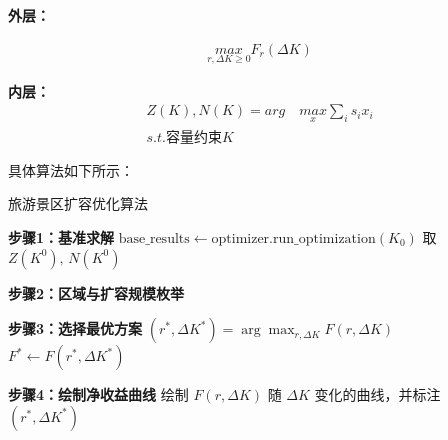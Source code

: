 \noindent\textbf{外层：}

\begin{equation}
  \begin{aligned}
    \underset{r,\Delta K \geq 0}{max} F_{r}(\Delta K)
  \end{aligned}
\end{equation}

\noindent\textbf{内层：}
\begin{equation}
  \begin{aligned}
    Z(K),N(K)=arg\quad \underset{x}{max} \sum_{i}s_{i}x_{i}\\
    s.t. \text{容量约束}K
  \end{aligned}
\end{equation}

具体算法如下所示：

\begin{algorithm}[H]\small
  \renewcommand{\algorithmcfname}{算法}
  \caption{旅游景区扩容优化算法}


  \textbf{步骤1：基准求解}\;
  $\text{base\_results}\leftarrow\text{optimizer.run\_optimization}(K_0)$\;
  取 $Z(K^0),\,N(K^0)$\;

  \textbf{步骤2：区域与扩容规模枚举}\;

  \textbf{步骤3：选择最优方案}\;
  $(r^*,\Delta K^*) = \arg\max_{r,\Delta K} F(r,\Delta K)$\;
  $F^* \leftarrow F(r^*,\Delta K^*)$\;

  \textbf{步骤4：绘制净收益曲线}\;
  绘制 $F(r,\Delta K)$ 随 $\Delta K$ 变化的曲线，并标注 $(r^*,\Delta K^*)$\;

  \label{algorithm:expansion_optimization}
\end{algorithm}


